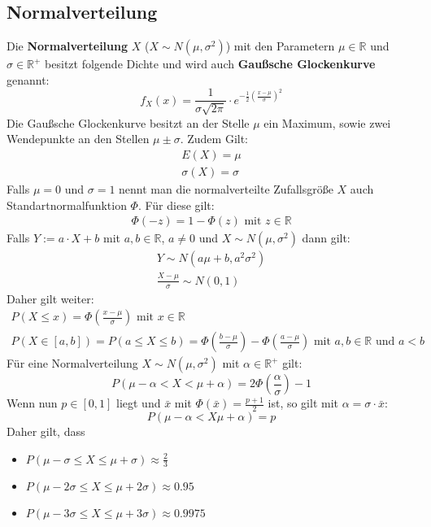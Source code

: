 \documentclass[12pt]{article}
\begin{document}
\subsection{Normalverteilung}
Die \textbf{Normalverteilung} $X$ ($X\sim N(\mu , \sigma^2)$) mit den Parametern $\mu\in\mathbb{R}$ und $\sigma\in\mathbb{R}^+$ besitzt folgende Dichte und wird auch \textbf{Gaußsche Glockenkurve} genannt:
\begin{equation*}
	f_X(x)=\frac{1}{\sigma\sqrt{2\pi}}\cdot e^{-\frac{1}{2}(\frac{x-\mu}{\sigma})^2}
\end{equation*}
Die Gaußsche Glockenkurve besitzt an der Stelle $\mu$ ein Maximum, sowie zwei Wendepunkte an den Stellen $\mu\pm\sigma$. Zudem Gilt:
\begin{gather*}
	E(X)=\mu \\
	\sigma(X)=\sigma
\end{gather*}
Falls $\mu = 0$ und $\sigma = 1$ nennt man die normalverteilte Zufallsgröße $X$ auch Standartnormalfunktion $\Phi$. Für diese gilt:
\begin{gather*}
	\Phi(-z) = 1-\Phi(z) \text{ mit } z\in\mathbb{R}
\end{gather*} 
Falls $Y:=a\cdot X+b$ mit $a,b\in\mathbb{R}$, $a\neq 0$ und $X\sim N(\mu,\sigma^2)$ dann gilt:
\begin{gather*}
	Y\sim N(a\mu+b,a^2\sigma^2)\\
	\frac{X-\mu}{\sigma}\sim N(0,1)
\end{gather*}
Daher gilt weiter:
\begin{gather*}
	P(X\leq x)=\Phi\left(\frac{x-\mu}{\sigma}\right) \text{ mit } x\in\mathbb{R}\\
	P(X\in[a,b])=P(a\leq X\leq b)=\Phi\left(\frac{b-\mu}{\sigma}\right)-\Phi\left(\frac{a-\mu}{\sigma}\right) \text{ mit } a,b\in\mathbb{R} \text{ und } a<b
\end{gather*}
Für eine Normalverteilung $X\sim N(\mu,\sigma^2)$ mit $\alpha\in\mathbb{R}^+$ gilt:
\begin{equation*}
	P(\mu-\alpha<X<\mu+\alpha)=2\Phi\left(\frac{\alpha}{\sigma}\right)-1
\end{equation*}
Wenn nun $p\in[0,1]$ liegt und $\bar{x}$ mit $\Phi(\bar{x})=\frac{p+1}{2}$ ist, so gilt mit $\alpha=\sigma\cdot\bar{x}$:
\begin{equation*}
	P(\mu-\alpha<X\mu+\alpha)=p
\end{equation*}
Daher gilt, dass
\begin{itemize}
	\item $P(\mu-\sigma\leq X\leq\mu+\sigma)\approx\frac{2}{3}$
	\item $P(\mu-2\sigma\leq X\leq\mu+2\sigma)\approx 0.95$
	\item $P(\mu-3\sigma\leq X\leq\mu+3\sigma)\approx 0.9975$
\end{itemize}
\end{document}
